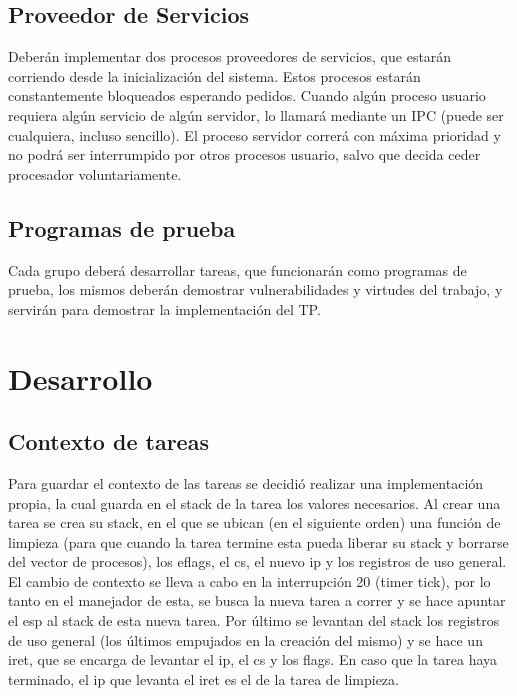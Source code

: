 \documentclass[a4paper,10pt]{article}
\begin{document}
\subsection{Proveedor de Servicios}
Deberán implementar dos procesos proveedores de servicios, que estarán corriendo 
desde la inicialización del sistema. Estos procesos estarán constantemente
bloqueados esperando pedidos. Cuando algún proceso usuario requiera algún
servicio de algún servidor, lo llamará mediante un IPC (puede ser cualquiera,
incluso sencillo). El proceso servidor correrá con máxima prioridad y no podrá
ser interrumpido por otros procesos usuario, salvo que decida ceder procesador
voluntariamente.

\subsection{Programas de prueba}
Cada grupo deberá desarrollar tareas, que funcionarán como programas de
prueba, los mismos deberán demostrar vulnerabilidades y virtudes del trabajo,
y servirán para demostrar la implementación del TP.


\newpage


\section{Desarrollo}

\subsection{Contexto de tareas}
Para guardar el contexto de las tareas se decidió realizar una implementación propia, 
la cual guarda en el stack de la tarea los valores necesarios. Al crear una tarea se crea
su stack, en el que se ubican (en el siguiente orden) una función de limpieza (para que 
cuando la tarea termine esta pueda liberar su stack y borrarse del vector de procesos), 
los eflags, el cs, el nuevo ip y los registros de uso general. \\
El cambio de contexto se lleva a cabo en la interrupción 20 (timer tick), por lo tanto 
en el manejador de esta, se busca la nueva tarea a correr y se hace apuntar el esp al stack 
de esta nueva tarea. Por último se levantan del stack los registros de uso general (los últimos 
empujados en la creación del mismo) y se hace un iret, que se encarga de levantar el ip, el cs 
y los flags. En caso que la tarea haya terminado, el ip que levanta el iret es el de la tarea 
de limpieza.
\end{document}
